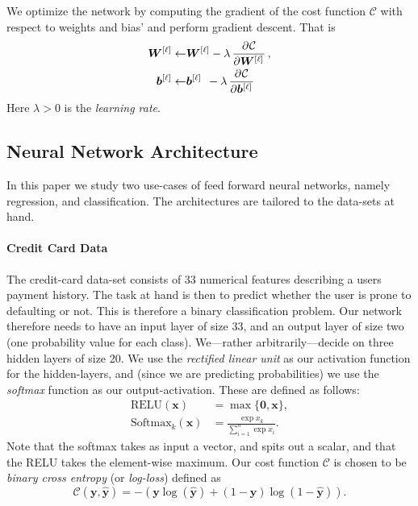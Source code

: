 \documentclass[a4paper, oneside, article]{memoir}
\newcommand{\yhat}{\hat{\bm{y}}}
\newcommand{\mat}[1]{\bm{#1}}
\newcommand{\cost}{\mathcal{C}}
\begin{document}
	We optimize the network by computing the gradient of the cost function
	\( \cost \) with respect to weights and bias' and perform gradient
	descent. That is
	\begin{align}
		\begin{split}
			\mat{W}^{[\ell]} \leftarrow &\mat{W}^{[\ell]} - \lambda \dpd{\cost}{{\mat{W}^{[\ell]}}}, \\ 
			\mat{b}^{[\ell]} \leftarrow &\mat{b}^{[\ell]}\;\, - \lambda \dpd{\cost}{{\mat{b}^{[\ell]}}}
		\end{split}
	\end{align}
	Here \( \lambda > 0 \) is the \emph{learning rate}.

	\subsection{Neural Network Architecture}

	In this paper we study two use-cases of feed forward neural networks,
	namely regression, and classification. The architectures are tailored
	to the data-sets at hand. 
	
	\paragraph{Credit Card Data}

	The credit-card data-set consists of 33 numerical features describing a
	users payment history.  The task at hand is then to predict whether the
	user is prone to defaulting or not. This is therefore a binary
	classification problem. Our network therefore needs to have an input
	layer of size 33, and an output layer of size two (one probability
	value for each class). We---rather arbitrarily---decide on three hidden
	layers of size 20. We use the \emph{rectified linear unit} as our
	activation function for the hidden-layers, and (since we are predicting
	probabilities) we use the \emph{softmax} function as our
	output-activation. These are defined as follows:
	\begin{align}
		\mathrm{RELU}(\mat{x}) &= \max\{\mat{0}, \mat{x}\}, \\
		\mathrm{Softmax}_k(\mat{x}) &= \frac{\exp{x_k}}{\sum_{i=1}^n \exp{x_i}}.
	\end{align}
	Note that the softmax takes as input a vector, and spits out a scalar,
	and that the RELU takes the element-wise maximum.
	Our cost function \( \cost \) is chosen to be \emph{binary cross
	entropy} (or \emph{log-loss}) defined as
	\begin{equation}
		\cost(\mat{y}, \yhat) = -(\mat{y} \log(\yhat) + (1 - \mat{y}) \log(1 - \yhat)).
	\end{equation}
\end{document}
